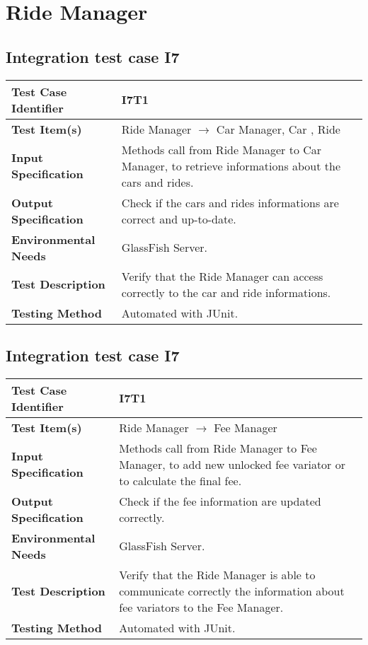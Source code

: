 \section{Ride Manager}
\subsection{Integration test case I7}

\begin{tabular}{l p{}}
    \hline
    \textbf{Test Case Identifier} & I7T1\\
    \hline
    \textbf{Test Item(s)} & Ride Manager $\rightarrow$ Car Manager, Car , Ride\\
    \hline
    \textbf{Input Specification} & Methods call from Ride Manager to Car Manager, to retrieve informations about the cars and rides.\\
    \hline
    \textbf{Output Specification} & Check if the cars and rides informations are correct and up-to-date.\\
    \hline
    \textbf{Environmental Needs} & GlassFish Server. \\
    \hline
    \textbf{Test Description} & Verify that the Ride Manager can access correctly to the car and ride informations.\\
    \hline
    \textbf{Testing Method} & Automated with JUnit.\\
    \hline
\end{tabular}

\subsection{Integration test case I7}

\begin{tabular}{l p{}}
    \hline
    \textbf{Test Case Identifier} & I7T1\\
    \hline
    \textbf{Test Item(s)} & Ride Manager $\rightarrow$ Fee Manager\\
    \hline
    \textbf{Input Specification} & Methods call from Ride Manager to Fee Manager, to add new unlocked fee variator or to calculate the final fee.\\
    \hline
    \textbf{Output Specification} & Check if the fee information are updated correctly.\\
    \hline
    \textbf{Environmental Needs} & GlassFish Server. \\
    \hline
    \textbf{Test Description} & Verify that the Ride Manager is able to communicate correctly the information about fee variators to the Fee Manager.\\
    \hline
    \textbf{Testing Method} & Automated with JUnit.\\
    \hline
\end{tabular}
